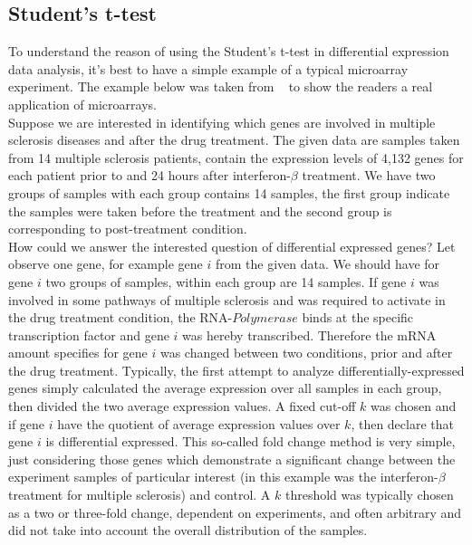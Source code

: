 \subsection{Student's t-test}
To understand the reason of using the Student's t-test in differential expression data analysis, it's best to have a simple example of a typical microarray experiment. The example below was taken from ~\citep{zhang:2007} to show the readers a real application of microarrays.
\\
Suppose we are interested in identifying which genes are involved in multiple sclerosis diseases and after the drug treatment. The given data are samples taken from 14 multiple sclerosis patients, contain the expression levels of 4,132 genes for each patient prior to and 24 hours after interferon-$\beta$ treatment. We have two groups of samples with each group contains 14 samples, the first group indicate the samples were taken before the treatment and the second group is corresponding to post-treatment condition.
\\[1ex]
How could we answer the interested question of differential expressed genes? Let observe one gene, for example gene $i$ from the given data. We should have for gene $i$ two groups of samples, within each group are 14 samples. If gene $i$ was involved in some pathways of multiple sclerosis and was required to activate in the drug treatment condition, the RNA-$Polymerase$ binds at the specific transcription factor and gene $i$ was hereby transcribed. Therefore the mRNA amount specifies for gene $i$ was changed between two conditions, prior and after the drug treatment. Typically, the first attempt to analyze differentially-expressed genes simply calculated the average expression over all samples in each group, then divided the two average expression values. A fixed cut-off $k$ was chosen and if gene $i$ have the quotient of average expression values over $k$, then declare that gene $i$ is differential expressed. This so-called fold change method is very simple, just considering those genes which demonstrate a significant change between the experiment samples of particular interest (in this example was the interferon-$\beta$ treatment for multiple sclerosis) and control. A $k$ threshold was typically chosen as a two or three-fold change, dependent on experiments, and often arbitrary and did not take into account the overall distribution of the samples.
